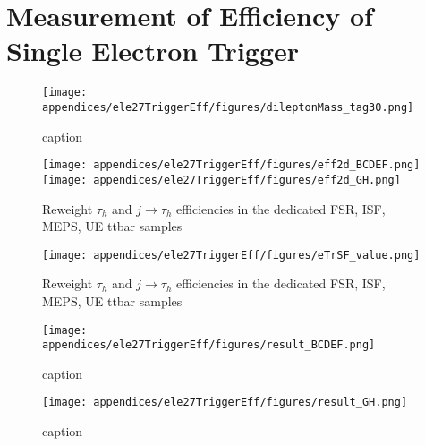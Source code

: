 
\chapter{Measurement of Efficiency of Single Electron Trigger}

\begin{figure}
    \centering
    \texttt{[image: appendices/ele27TriggerEff/figures/dileptonMass\_tag30.png]}
    \caption{caption}
    \label{fig:appendix:ele27TriggerSF}
\end{figure}



\begin{figure}
    \centering
    \texttt{[image: appendices/ele27TriggerEff/figures/eff2d\_BCDEF.png]}
    \texttt{[image: appendices/ele27TriggerEff/figures/eff2d\_GH.png]}
    \caption{Reweight $\tau_h$ and $j \to \tau_h$ efficiencies in the dedicated FSR, ISF, MEPS, UE ttbar samples}
    \label{fig:appendix:ele27SF}
\end{figure}


\begin{figure}
    \centering
    \texttt{[image: appendices/ele27TriggerEff/figures/eTrSF\_value.png]}
    \caption{Reweight $\tau_h$ and $j \to \tau_h$ efficiencies in the dedicated FSR, ISF, MEPS, UE ttbar samples}
    \label{fig:appendix:ele27SF}
\end{figure}





\begin{figure}
    \centering
    \texttt{[image: appendices/ele27TriggerEff/figures/result\_BCDEF.png]}
    
    \caption{caption}
    \label{fig:appendix:ele27SF}
\end{figure}

\begin{figure}
    \centering
    \texttt{[image: appendices/ele27TriggerEff/figures/result\_GH.png]}
    
    \caption{caption}
    \label{fig:appendix:ele27SF}
\end{figure}
